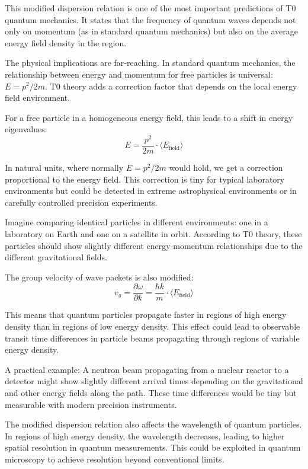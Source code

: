 \documentclass[12pt,a4paper]{article}
\theoremstyle{definition}
\theoremstyle{remark}
\begin{document}
This modified dispersion relation is one of the most important predictions of T0 quantum mechanics. It states that the frequency of quantum waves depends not only on momentum (as in standard quantum mechanics) but also on the average energy field density in the region.

The physical implications are far-reaching. In standard quantum mechanics, the relationship between energy and momentum for free particles is universal: $E = p^2/2m$. T0 theory adds a correction factor that depends on the local energy field environment.

For a free particle in a homogeneous energy field, this leads to a shift in energy eigenvalues:
$$E = \frac{p^2}{2m} \cdot \langle E_{\text{field}} \rangle$$

In natural units, where normally $E = p^2/2m$ would hold, we get a correction proportional to the energy field. This correction is tiny for typical laboratory environments but could be detected in extreme astrophysical environments or in carefully controlled precision experiments.

Imagine comparing identical particles in different environments: one in a laboratory on Earth and one on a satellite in orbit. According to T0 theory, these particles should show slightly different energy-momentum relationships due to the different gravitational fields.

The group velocity of wave packets is also modified:
$$v_g = \frac{\partial \omega}{\partial k} = \frac{\hbar k}{m} \cdot \langle E_{\text{field}} \rangle$$

This means that quantum particles propagate faster in regions of high energy density than in regions of low energy density. This effect could lead to observable transit time differences in particle beams propagating through regions of variable energy density.

A practical example: A neutron beam propagating from a nuclear reactor to a detector might show slightly different arrival times depending on the gravitational and other energy fields along the path. These time differences would be tiny but measurable with modern precision instruments.

The modified dispersion relation also affects the wavelength of quantum particles. In regions of high energy density, the wavelength decreases, leading to higher spatial resolution in quantum measurements. This could be exploited in quantum microscopy to achieve resolution beyond conventional limits.
\end{document}
